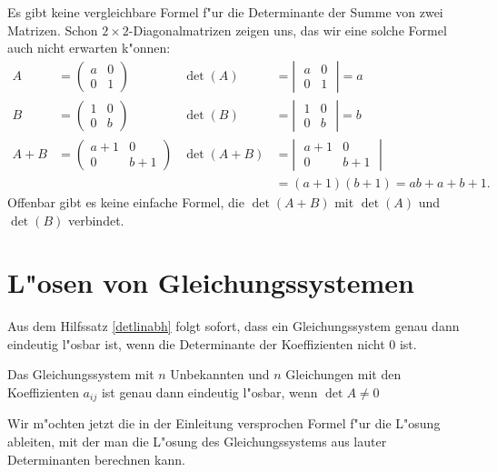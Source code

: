 Es gibt keine vergleichbare Formel f"ur die Determinante der Summe
von zwei Matrizen.
Schon $2\times 2$-Diagonalmatrizen zeigen uns,
das wir eine solche Formel auch nicht erwarten k"onnen:
\begin{align*}
A&=\begin{pmatrix}a&0\\0&1\end{pmatrix}&
\det(A)&=\left|\;\begin{matrix}a  &0\\0&  1\end{matrix}\;\right|= a\\
B&=\begin{pmatrix}1&0\\0&b\end{pmatrix}&
\det(B)&=\left|\;\begin{matrix}  1&0\\0&b  \end{matrix}\;\right|= b\\
A+B&=\begin{pmatrix}a+1&0\\0&b+1\end{pmatrix}
&
\det(A+B)&=\left|\;\begin{matrix}a+1&0\\0&b+1\end{matrix}\;\right|\\
&&&=(a+1)(b+1)=ab+a+b+1.
\end{align*}
Offenbar gibt es keine einfache Formel, die $\det(A+B)$ mit $\det(A)$ und
$\det(B)$ verbindet.

\section{L"osen von Gleichungssystemen}
Aus dem Hilfssatz \ref{detlinabh} folgt sofort, dass ein Gleichungssystem
genau dann eindeutig l"osbar ist, wenn die Determinante der Koeffizienten
nicht $0$ ist.

\begin{satz}
Das Gleichungssystem mit $n$ Unbekannten und $n$ Gleichungen
mit den Koeffizienten $a_{ij}$ ist genau dann eindeutig l"osbar,
wenn
$\det A\ne 0$
\end{satz}

Wir m"ochten jetzt die in der Einleitung versprochen Formel f"ur die L"osung
ableiten, mit der man die L"osung des Gleichungssystems aus lauter
Determinanten berechnen kann.

